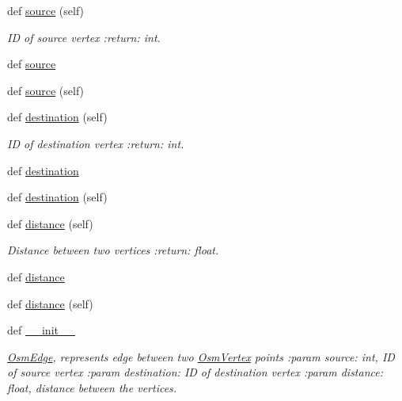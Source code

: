 \begin{DoxyCompactItemize}
\item 
def \hyperlink{classbridges_1_1data__src__dependent_1_1osm_1_1_osm_edge_a52c735a9496d74764fbcf29805d4f372}{source} (self)
\begin{DoxyCompactList}\small\item\em ID of source vertex \+:return\+: int. \end{DoxyCompactList}\item 
def \hyperlink{classbridges_1_1data__src__dependent_1_1osm_1_1_osm_edge_a7e91ba375c45e21b3364f84d3415384d}{source}
\item 
def \hyperlink{classbridges_1_1data__src__dependent_1_1osm_1_1_osm_edge_a52c735a9496d74764fbcf29805d4f372}{source} (self)
\item 
def \hyperlink{classbridges_1_1data__src__dependent_1_1osm_1_1_osm_edge_ac3e5f99dd826c60fba46a5db69ee4b12}{destination} (self)
\begin{DoxyCompactList}\small\item\em ID of destination vertex \+:return\+: int. \end{DoxyCompactList}\item 
def \hyperlink{classbridges_1_1data__src__dependent_1_1osm_1_1_osm_edge_a985f37861dec03b102c0230259a27e50}{destination}
\item 
def \hyperlink{classbridges_1_1data__src__dependent_1_1osm_1_1_osm_edge_ac3e5f99dd826c60fba46a5db69ee4b12}{destination} (self)
\item 
def \hyperlink{classbridges_1_1data__src__dependent_1_1osm_1_1_osm_edge_ae20fb44608780d4f10f55c1a85e4d410}{distance} (self)
\begin{DoxyCompactList}\small\item\em Distance between two vertices \+:return\+: float. \end{DoxyCompactList}\item 
def \hyperlink{classbridges_1_1data__src__dependent_1_1osm_1_1_osm_edge_aa3931845de062f70bae375a389a9262d}{distance}
\item 
def \hyperlink{classbridges_1_1data__src__dependent_1_1osm_1_1_osm_edge_ae20fb44608780d4f10f55c1a85e4d410}{distance} (self)
\item 
def \hyperlink{classbridges_1_1data__src__dependent_1_1osm_1_1_osm_edge_ac0f57be58220744c49bffc353d73db6f}{\+\_\+\+\_\+init\+\_\+\+\_\+}
\begin{DoxyCompactList}\small\item\em \hyperlink{classbridges_1_1data__src__dependent_1_1osm_1_1_osm_edge}{Osm\+Edge}, represents edge between two \hyperlink{classbridges_1_1data__src__dependent_1_1osm_1_1_osm_vertex}{Osm\+Vertex} points \+:param source\+: int, ID of source vertex \+:param destination\+: ID of destination vertex \+:param distance\+: float, distance between the vertices. \end{DoxyCompactList}\end{DoxyCompactItemize}
